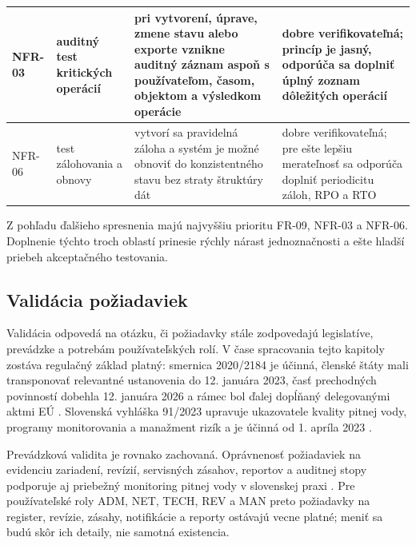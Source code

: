 \begin{longtable}{|p{1.8cm}|p{3.2cm}|p{4.3cm}|p{5.0cm}|}
\hline
NFR-03 & auditný test kritických operácií & pri vytvorení, úprave, zmene stavu alebo exporte vznikne auditný záznam aspoň s používateľom, časom, objektom a výsledkom operácie & dobre verifikovateľná; princíp je jasný, odporúča sa doplniť úplný zoznam dôležitých operácií \\
\hline
NFR-06 & test zálohovania a obnovy & vytvorí sa pravidelná záloha a systém je možné obnoviť do konzistentného stavu bez straty štruktúry dát & dobre verifikovateľná; pre ešte lepšiu merateľnosť sa odporúča doplniť periodicitu záloh, RPO a RTO \\
\hline
\end{longtable}
\normalsize

Z pohľadu ďalšieho spresnenia majú najvyššiu prioritu FR-09, NFR-03 a NFR-06. Doplnenie týchto troch oblastí prinesie rýchly nárast jednoznačnosti a ešte hladší priebeh akceptačného testovania.

\subsection{Validácia požiadaviek}

Validácia odpovedá na otázku, či požiadavky stále zodpovedajú legislatíve, prevádzke a potrebám používateľských rolí. V čase spracovania tejto kapitoly zostáva regulačný základ platný: smernica 2020/2184 je účinná, členské štáty mali transponovať relevantné ustanovenia do 12. januára 2023, časť prechodných povinností dobehla 12. januára 2026 a rámec bol ďalej dopĺňaný delegovanými aktmi EÚ \cite{EUDWD2020,EUDWDDelegated2024}. Slovenská vyhláška 91/2023 upravuje ukazovatele kvality pitnej vody, programy monitorovania a manažment rizík a je účinná od 1. apríla 2023 \cite{SKVyhlaska912023}.

Prevádzková validita je rovnako zachovaná. Oprávnenosť požiadaviek na evidenciu zariadení, revízií, servisných zásahov, reportov a auditnej stopy podporuje aj priebežný monitoring pitnej vody v slovenskej praxi \cite{UVZPitnaVodaMapy}. Pre používateľské roly ADM, NET, TECH, REV a MAN preto požiadavky na register, revízie, zásahy, notifikácie a reporty ostávajú vecne platné; meniť sa budú skôr ich detaily, nie samotná existencia.

